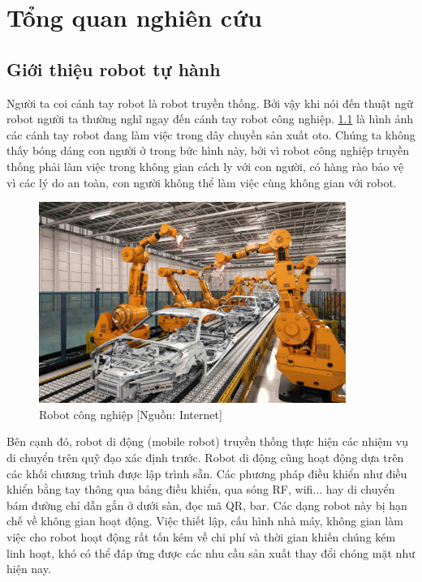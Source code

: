 \chapter{Tổng quan nghiên cứu}
\label{chap:1tqnc}

\section{Giới thiệu robot tự hành}


%

Người ta coi cánh tay robot là robot truyền thống.
Bởi vậy khi nói đến thuật ngữ robot người ta thường nghĩ ngay đến cánh tay robot công nghiệp. \figurename{ \ref{fig:RBCongNghiep}} là hình ảnh các cánh tay robot đang làm việc trong dây chuyền sản xuất oto. Chúng ta không thấy bóng dáng con người ở trong bức hình này, bởi vì robot công nghiệp truyền thống phải làm việc trong không gian cách ly với con người, có hàng rào bảo vệ vì các lý do an toàn, con người không thể làm việc cùng không gian với robot.

\begin{figure}[hpt]
  \centering
  \includegraphics[width=10cm]{figures/IndustrialRobot.jpg}
  \caption{Robot công nghiệp [Nguồn: Internet]}
  \label{fig:RBCongNghiep}
\end{figure}

Bên cạnh đó, robot di động (mobile robot) truyền thống thực hiện các nhiệm vụ di chuyển trên quỹ đạo xác định trước. Robot di động cũng hoạt động dựa trên các khối chương trình được lập trình sẵn. Các phương pháp điều khiển như điều khiển bằng tay thông qua bảng điều khiển, qua sóng RF, wifi... hay di chuyển bám đường chỉ dẫn gắn ở dưới sàn, đọc mã QR, bar. Các dạng robot này bị hạn chế về không gian hoạt động. Việc thiết lập, cấu hình nhà máy, không gian làm việc cho robot hoạt động rất tốn kém về chi phí và thời gian khiến chúng kém linh hoạt, khó có thể đáp ứng được các nhu cầu sản xuất thay đổi chóng mặt như hiện nay.

